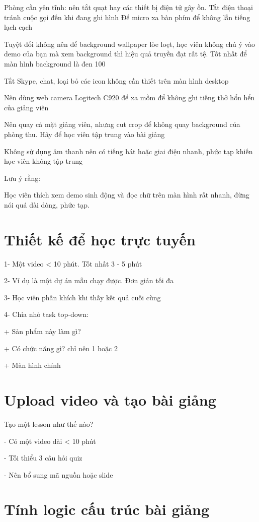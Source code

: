 Phòng cần yên tĩnh: nên tắt quạt hay các thiết bị điện tử gây ồn. Tắt điện thoại tránh cuộc gọi đến khi đang ghi hình
Để micro xa bàn phím để không lẫn tiếng lạch cạch

Tuyệt đối không nên để background wallpaper lòe loẹt, học viên không chú ý vào demo của bạn mà xem background thì hiệu quả truyền đạt rất tệ. Tốt nhất để màn hình background là đen 100%

Tắt Skype, chat, loại bỏ các icon không cần thiết trên màn hình desktop

Nên dùng web camera Logitech C920 để xa mồm để không ghi tiếng thở hổn hển của giảng viên

Nên quay cả mặt giảng viên, nhưng cut crop để không quay background của phòng thu. Hãy để học viên tập trung vào bài giảng

Không sử dụng âm thanh nên có tiếng hát hoặc giai điệu nhanh, phức tạp khiến học viên không tập trung

Lưu ý rằng:

Học viên thích xem demo sinh động và đọc chữ trên màn hình rất nhanh, đừng nói quá dài dòng, phức tạp.

\section{Thiết kế để học trực tuyến}

1- Một video < 10 phút. Tốt nhất 3 - 5 phút

2- Ví dụ là một dự án mẫu chạy được. Đơn giản tối đa

3- Học viên phấn khích khi thấy kết quả cuối cùng

4- Chia nhỏ task top-down:

+ Sản phẩm này làm gì?

+ Có chức năng gì? chỉ nên 1 hoặc 2

+ Màn hình chính

\section{Upload video và tạo bài giảng}

Tạo một lesson như thế nào?

- Có một video dài < 10 phút

- Tối thiểu 3 câu hỏi quiz

- Nên bổ sung mã nguồn hoặc slide

\section{Tính logic cấu trúc bài giảng}

